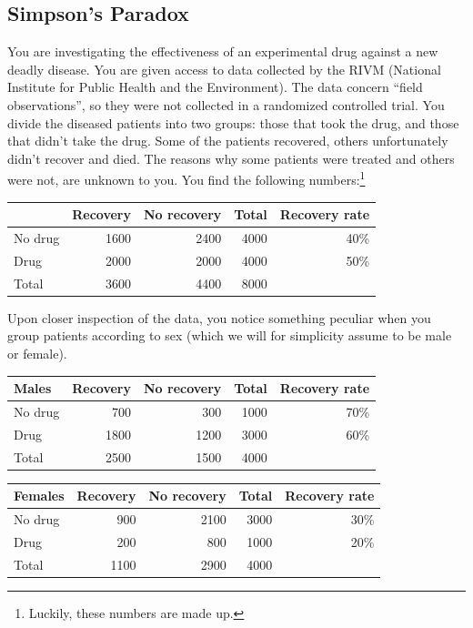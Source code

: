 \subsection{Simpson's Paradox}
You are investigating the effectiveness of an experimental drug against a new deadly disease.
You are given access to data collected by the RIVM (National Institute for Public Health and the Environment). 
The data concern ``field observations'', so they were not collected in a randomized controlled trial.
You divide the diseased patients into two groups: those that took the drug, and those that didn't take the drug.
Some of the patients recovered, others unfortunately didn't recover and died. 
The reasons why some patients were treated and others were not, are unknown to you.
You find the following numbers:\footnote{Luckily, these numbers are made up.}
\begin{center}\begin{tabular}{l|rr|r|r}
          & Recovery & No recovery & Total & Recovery rate \\
  \hline
  No drug & 1600       & 2400          & 4000    & 40\%       \\
  Drug    & 2000       & 2000          & 4000    & 50\%       \\
  \hline
  Total   & 3600       & 4400          & 8000    &               \\
\end{tabular}\end{center}
Upon closer inspection of the data, you notice something peculiar when you group patients according to sex 
(which we will for simplicity assume to be male or female).
\begin{center}\begin{tabular}{l|rr|r|r}
  Males & Recovery & No recovery & Total & Recovery rate \\
  \hline
  No drug        & 700        & 300           & 1000    & 70\%       \\
  Drug           & 1800       & 1200          & 3000    & 60\%       \\
  \hline
  Total          & 2500       & 1500          & 4000    &               \\
\end{tabular}

\medskip
\begin{tabular}{l|rr|r|r}
  Females & Recovery & No recovery & Total & Recovery rate \\
  \hline
  No drug          & 900        & 2100          & 3000    & 30\%       \\
  Drug             & 200        & 800           & 1000    & 20\%       \\
  \hline
  Total            & 1100       & 2900          & 4000    &               \\
\end{tabular}\end{center}

